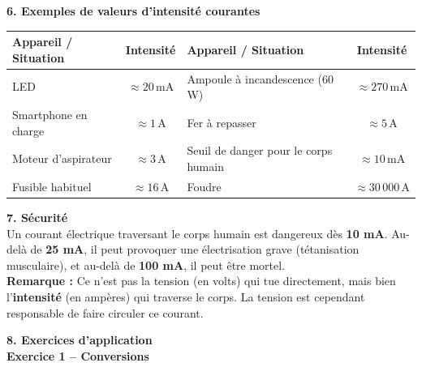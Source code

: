 \documentclass[11pt,a4paper]{article}
\renewcommand{\arraystretch}{2}
\begin{document}

\vfill

\textbf{6. Exemples de valeurs d'intensité courantes}

\begin{center}
\renewcommand{\arraystretch}{1.5}
\begin{tabular}{|l|c||l|c|}
\hline
\textbf{Appareil / Situation} & \textbf{Intensité} & \textbf{Appareil / Situation} & \textbf{Intensité} \\
\hline
LED & $\approx 20\,\text{mA}$ & Ampoule à incandescence (60 W) & $\approx 270\,\text{mA}$ \\
\hline
Smartphone en charge & $\approx 1\,\text{A}$ & Fer à repasser & $\approx 5\,\text{A}$ \\
\hline
Moteur d'aspirateur & $\approx 3\,\text{A}$ & Seuil de danger pour le corps humain & $\approx 10\,\text{mA}$ \\
\hline
Fusible habituel & $\approx 16\,\text{A}$ & Foudre & $\approx 30\,000\,\text{A}$ \\
\hline
\end{tabular}
\end{center}

\vfill

\textbf{7. Sécurité} \\

Un courant électrique traversant le corps humain est dangereux dès \textbf{10 mA}. Au-delà de \textbf{25 mA}, il peut provoquer une électrisation grave (tétanisation musculaire), et au-delà de \textbf{100 mA}, il peut être mortel. \\

\textbf{Remarque : } Ce n'est pas la tension (en volts) qui tue directement, mais bien l'\textbf{intensité} (en ampères) qui traverse le corps. La tension est cependant responsable de faire circuler ce courant. \\

\vfill

\newpage

\textbf{8. Exercices d'application} \\

\textbf{Exercice 1 -- Conversions}
\end{document}

